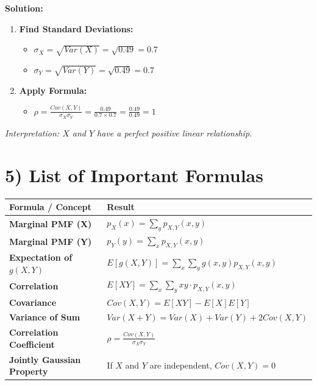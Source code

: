 \documentclass[11pt]{article}
\begin{document}
\textbf{Solution:}
\begin{enumerate}
    \item \textbf{Find Standard Deviations:}
    \begin{itemize}
        \item $\sigma_X = \sqrt{Var(X)} = \sqrt{0.49} = 0.7$
        \item $\sigma_Y = \sqrt{Var(Y)} = \sqrt{0.49} = 0.7$
    \end{itemize}
    \item \textbf{Apply Formula:}
    \begin{itemize}
        \item $\rho = \frac{Cov(X,Y)}{\sigma_X \sigma_Y} = \frac{0.49}{0.7 \times 0.7} = \frac{0.49}{0.49} = 1$
    \end{itemize}
\end{enumerate}
\textit{Interpretation: $X$ and $Y$ have a perfect positive linear relationship.}

\newpage

\section*{5) List of Important Formulas}

\begin{table}[h!]
\centering
\renewcommand{\arraystretch}{1.8}
\setlength{\tabcolsep}{12pt}
\begin{tabular}{ll}
\toprule
\textbf{Formula / Concept} & \textbf{Result} \\
\midrule
\textbf{Marginal PMF (X)} & $p_X(x) = \sum_y p_{X,Y}(x,y)$ \\
\textbf{Marginal PMF (Y)} & $p_Y(y) = \sum_x p_{X,Y}(x,y)$ \\
\textbf{Expectation of $g(X,Y)$} & $E[g(X,Y)] = \sum_x \sum_y g(x,y) p_{X,Y}(x,y)$ \\
\textbf{Correlation} & $E[XY] = \sum_x \sum_y xy \cdot p_{X,Y}(x,y)$ \\
\textbf{Covariance} & $Cov(X,Y) = E[XY] - E[X]E[Y]$ \\
\textbf{Variance of Sum} & $Var(X+Y) = Var(X) + Var(Y) + 2Cov(X,Y)$ \\
\textbf{Correlation Coefficient} & $\rho = \frac{Cov(X,Y)}{\sigma_X \sigma_Y}$ \\
\textbf{Jointly Gaussian Property} & If $X$ and $Y$ are independent, $Cov(X,Y) = 0$ \\
\bottomrule
\end{tabular}
\end{table}
\end{document}
